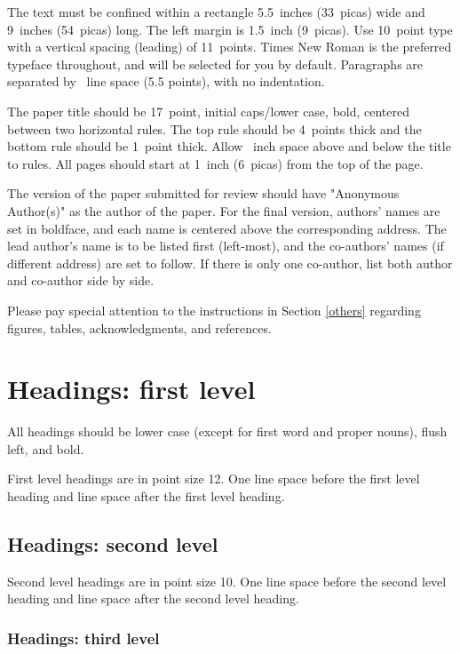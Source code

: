 \documentclass{article}
\begin{document}
The text must be confined within a rectangle 5.5~inches (33~picas) wide and
9~inches (54~picas) long. The left margin is 1.5~inch (9~picas).  Use 10~point
type with a vertical spacing (leading) of 11~points.  Times New Roman is the
preferred typeface throughout, and will be selected for you by default.
Paragraphs are separated by ~line space (5.5 points), with no
indentation.

The paper title should be 17~point, initial caps/lower case, bold, centered
between two horizontal rules. The top rule should be 4~points thick and the
bottom rule should be 1~point thick. Allow ~inch space above and
below the title to rules. All pages should start at 1~inch (6~picas) from the
top of the page.

The version of the paper submitted for review should have "Anonymous Author(s)" as the author of the paper. 
For the final version, authors' names are set in boldface, and each name is
centered above the corresponding address. The lead author's name is to be listed
first (left-most), and the co-authors' names (if different address) are set to
follow. If there is only one co-author, list both author and co-author side by
side.

Please pay special attention to the instructions in Section \ref{others}
regarding figures, tables, acknowledgments, and references.

\section{Headings: first level}
\label{headings}

All headings should be lower case (except for first word and proper nouns),
flush left, and bold.

First level headings are in point size 12. One line space before the first level heading and  line space after the first level heading.

\subsection{Headings: second level}

Second level headings are in point size 10. One line space before the second level heading and  line space after the second level heading.

\subsubsection{Headings: third level}
\end{document}
